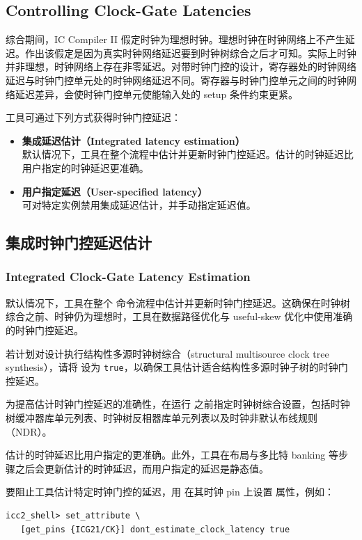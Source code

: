 \subsection*{Controlling Clock-Gate Latencies}

综合期间，IC Compiler II 假定时钟为理想时钟。理想时钟在时钟网络上不产生延迟。作出该假定是因为真实时钟网络延迟要到时钟树综合之后才可知。实际上时钟并非理想，时钟网络上存在非零延迟。对带时钟门控的设计，寄存器处的时钟网络延迟与时钟门控单元处的时钟网络延迟不同。寄存器与时钟门控单元之间的时钟网络延迟差异，会使时钟门控单元使能输入处的 setup 条件约束更紧。

工具可通过下列方式获得时钟门控延迟：
\begin{itemize}
  \item \textbf{集成延迟估计（Integrated latency estimation）}\\
    默认情况下，工具在整个流程中估计并更新时钟门控延迟。估计的时钟延迟比用户指定的时钟延迟更准确。
  \item \textbf{用户指定延迟（User-specified latency）}\\
    可对特定实例禁用集成延迟估计，并手动指定延迟值。
\end{itemize}

\subsection{集成时钟门控延迟估计}
\subsubsection*{Integrated Clock-Gate Latency Estimation}

默认情况下，工具在整个  命令流程中估计并更新时钟门控延迟。这确保在时钟树综合之前、时钟仍为理想时，工具在数据路径优化与 useful-skew 优化中使用准确的时钟门控延迟。

若计划对设计执行结构性多源时钟树综合（structural multisource clock tree synthesis），请将  设为 \texttt{true}，以确保工具估计适合结构性多源时钟子树的时钟门控延迟。

为提高估计时钟门控延迟的准确性，在运行  之前指定时钟树综合设置，包括时钟树缓冲器库单元列表、时钟树反相器库单元列表以及时钟非默认布线规则（NDR）。

估计的时钟延迟比用户指定的更准确。此外，工具在布局与多比特 banking 等步骤之后会更新估计的时钟延迟，而用户指定的延迟是静态值。

要阻止工具估计特定时钟门控的延迟，用  在其时钟 pin 上设置  属性，例如：
\begin{lstlisting}
icc2_shell> set_attribute \
   [get_pins {ICG21/CK}] dont_estimate_clock_latency true
\end{lstlisting}

